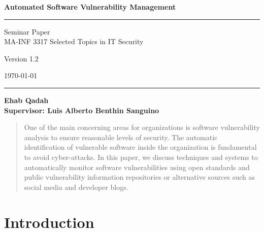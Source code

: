 \documentclass{llncs}
\begin{document}
\begin{flushleft}
 
 \thispagestyle{empty}
\centering\LARGE {\bf Automated Software Vulnerability Management}


\rule{\textwidth}{1pt}

\vspace{2pt}


\centering
 Seminar Paper  
 \\MA-INF 3317 Selected Topics in IT Security

{\Large Version 1.2 }

\vspace{8pt}
\today

\rule{\textwidth}{1pt}

\vspace{8 cm}

\centering
 \bf Ehab Qadah\\
 
 \vspace{7 pt}
\bf Supervisor: Luis Alberto Benthin Sanguino

\end{flushleft}


\newpage

\tableofcontents

\newpage


\begin{abstract}
One of the main concerning areas for organizations is software vulnerability analysis to ensure reasonable levels of security. The automatic identification of vulnerable software inside the organization is fundamental to avoid cyber-attacks. In this paper, we discuss techniques and systems to automatically monitor software vulnerabilities using open standards and public vulnerability information repositories or alternative sources such as social media and developer blogs. 
\end{abstract}

\section{Introduction}
\end{document}
